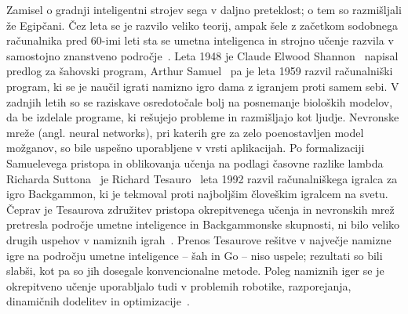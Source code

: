 \documentclass[a4paper, oneside, 12pt]{report}
\begin{document}
Zamisel o gradnji inteligentni strojev sega v daljno preteklost; o tem so razmišljali že Egipčani. Čez leta se je razvilo veliko teorij, ampak šele z začetkom sodobnega računalnika pred 60-imi leti sta se umetna inteligenca in strojno učenje razvila v samostojno znanstveno področje~\cite{TDANNForStrategicControlProblems}. Leta 1948 je Claude Elwood Shannon~\cite{AMathematicalTheoryOfCommunication} napisal predlog za šahovski program, Arthur Samuel~\cite{SomeStudiesInMachineLearningUsingTheGameOfCheckers} pa je leta 1959 razvil računalniški program, ki se je naučil igrati namizno igro dama z igranjem proti samem sebi. V zadnjih letih so se raziskave osredotočale bolj na posnemanje bioloških modelov, da be izdelale programe, ki rešujejo probleme in razmišljajo kot ljudje. Nevronske mreže (angl. neural networks), pri katerih gre za zelo poenostavljen model možganov, so bile uspešno uporabljene v vrsti aplikacijah. Po formalizaciji Samuelevega pristopa in oblikovanja učenja na podlagi časovne razlike lambda Richarda Suttona~\cite{LearningToPredictByTheMethodsOfTemporalDifference} je Richard Tesauro~\cite{PracticalIssuesInTemporalDifferenceLearning} leta 1992 razvil računalniškega igralca za igro Backgammon, ki je tekmoval proti najboljšim človeškim igralcem na svetu. Čeprav je Tesaurova združitev pristopa okrepitvenega učenja in nevronskih mrež pretresla področje umetne inteligence in Backgammonske skupnosti, ni bilo veliko drugih uspehov v namiznih igrah~\cite{PlayingRiskAversiveGoOnALargeBoardUsingLocalNeuralNetworkPositionEvaluationFunctions, StrategyAcquisitionForTheGameOthelloBasedOnReinforcementLearning, LearningToEvaluateGoPositionsViaTemporalDifferenceMethods}. Prenos Tesaurove rešitve v največje namizne igre na področju umetne inteligence -- šah in Go -- niso uspele; rezultati so bili slabši, kot pa so jih dosegale konvencionalne metode. Poleg namiznih iger se je okrepitveno učenje uporabljalo tudi v problemih robotike, razporejanja, dinamičnih dodelitev in optimizacije~\cite{ReinforcementLearningAnIntroduction}.

\end{document}

